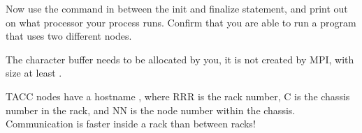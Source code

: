  \label{ex:procname}
  Now use the command 
  in between the
  init and finalize statement, and print out on what processor your process runs.
  Confirm that you are able to run a program that uses two different nodes.

  The character buffer needs to be allocated by you, it is not
  created by MPI, with size at
  least .

\begin{tacc}
    TACC nodes have a hostname , where RRR is the rack number, C is the chassis
    number in the rack, and NN is the node number within the chassis. Communication
    is faster inside a rack than between racks!
\end{tacc}
